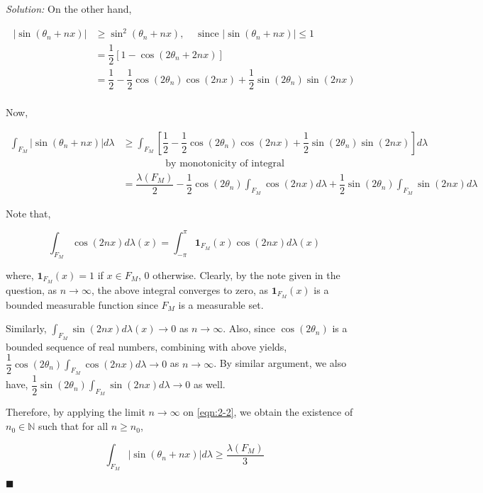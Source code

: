 \documentclass[12pt]{article}
\newcommand{\N}{\mathbb{N}}
\theoremstyle{definition}
\newenvironment{answer}{\textit{Solution: }\quad }{ \hfill $\blacksquare$}
\begin{document}
\begin{answer}
	On the other hand, 

	\begin{align*}
		\vert \sin (\theta_n + nx) \vert 
		& \geq \sin^2 (\theta_n + nx), \quad \text{ since } \vert \sin (\theta_n + nx) \vert \leq 1\\
		& = \dfrac{1}{2} \left[ 1 - \cos(2\theta_n + 2nx) \right]\\
		& = \dfrac{1}{2} - \dfrac{1}{2} \cos(2\theta_n)\cos(2nx) + \dfrac{1}{2} \sin(2\theta_n)\sin(2nx)\\
	\end{align*}

	Now, 

	\begin{equation}
		\begin{split}
		\int_{F_M} \vert \sin(\theta_n + nx) \vert d\lambda 
		& \geq \int_{F_M}  \left[\dfrac{1}{2} - \dfrac{1}{2} \cos(2\theta_n)\cos(2nx) + \dfrac{1}{2} \sin(2\theta_n)\sin(2nx)\right] d\lambda\\
		& \qquad \qquad \text{ by monotonicity of integral}\\
		& = \dfrac{\lambda(F_M)}{2} - \dfrac{1}{2} \cos(2\theta_n) \int_{F_M} \cos(2nx) d\lambda + \dfrac{1}{2} \sin(2\theta_n) \int_{F_M} \sin(2nx) d\lambda
		\end{split}
		\label{eqn:2-2}
	\end{equation}
	
	Note that, 

	$$\int_{F_M}\cos(2nx) d\lambda(x) = \int_{-\pi}^{\pi} \bm{1}_{F_M}(x) \cos(2nx) d\lambda(x)$$

	where, $\bm{1}_{F_M}(x) = 1$ if $x \in F_M$, $0$ otherwise. Clearly, by the note given in the question, as $n \rightarrow \infty$, the above integral converges to zero, as $\bm{1}_{F_M}(x)$ is a bounded measurable function since $F_M$ is a measurable set.

	Similarly, $\int_{F_M} \sin(2nx) d\lambda(x) \rightarrow 0$ as $n \rightarrow \infty$. Also, since $\cos(2\theta_n)$ is a bounded sequence of real numbers, combining with above yields, $\dfrac{1}{2} \cos(2\theta_n) \int_{F_M} \cos(2nx) d\lambda \rightarrow 0$ as $n \rightarrow \infty$. By similar argument, we also have, $\dfrac{1}{2} \sin(2\theta_n) \int_{F_M} \sin(2nx) d\lambda \rightarrow 0$ as well.

	Therefore, by applying the limit $n \rightarrow \infty$ on \cref{eqn:2-2}, we obtain the existence of $n_0 \in \N$ such that for all $n \geq n_0$, 

	$$\int_{F_M} \vert \sin(\theta_n + nx)\vert d\lambda \geq \dfrac{\lambda(F_M)}{3}$$


\end{answer}
\end{document}
